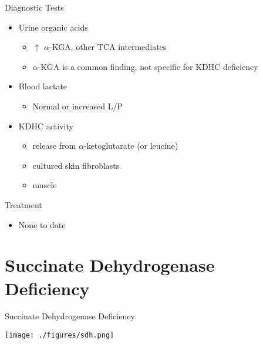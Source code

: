 \documentclass[presentation, smaller]{beamer}
\begin{document}
\begin{frame}[label={sec:org297294f}]{Diagnostic Tests}
\begin{itemize}
\item Urine organic acids
\begin{itemize}
\item \(\uparrow\) \(\alpha\)-KGA, \textpm{} other TCA intermediates
\item \(\alpha\)-KGA is a common finding, not specific for KDHC deficiency
\end{itemize}
\item Blood lactate
\begin{itemize}
\item Normal or increased L/P
\end{itemize}
\item KDHC activity
\begin{itemize}
\item {} release from \ce{[1-^14C]} \(\alpha\)-ketoglutarate (or \ce{[1-^14C]} leucine)
\item cultured skin fibroblasts
\item muscle
\end{itemize}
\end{itemize}
\end{frame}

\begin{frame}[label={sec:orgf206480}]{Treatment}
\begin{itemize}
\item None to date
\end{itemize}
\end{frame}


\section{Succinate Dehydrogenase Deficiency}
\label{sec:orge269c62}

\begin{frame}[label={sec:org998913b}]{Succinate Dehydrogenase Deficiency}
\begin{center}
\texttt{[image: ./figures/sdh.png]}
\end{center}
\end{frame}
\end{document}

